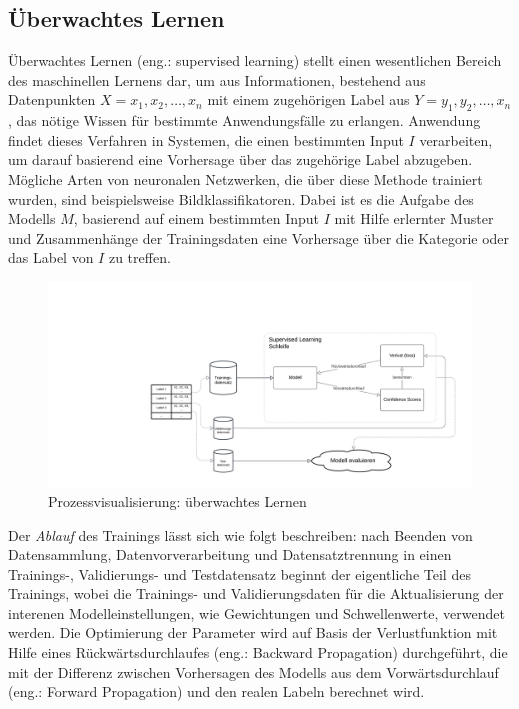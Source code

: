 \subsection{Überwachtes Lernen}\label{subsec:supervisedlearning}
Überwachtes Lernen (eng.: supervised learning) stellt einen wesentlichen Bereich des maschinellen Lernens dar, um aus Informationen, bestehend aus Datenpunkten \textit{$X = x_1, x_2, \ldots, x_n$} mit einem zugehörigen Label aus \textit{$Y = y_1, y_2, \ldots, x_n$}, das nötige Wissen für bestimmte Anwendungsfälle zu erlangen. Anwendung findet dieses Verfahren in Systemen, die einen bestimmten Input $I$ verarbeiten, um darauf basierend eine Vorhersage über das zugehörige Label abzugeben.
Mögliche Arten von neuronalen Netzwerken, die über diese Methode trainiert wurden, sind beispielsweise Bildklassifikatoren. Dabei ist es die Aufgabe des Modells $M$, basierend auf einem bestimmten Input $I$ mit Hilfe erlernter Muster und Zusammenhänge der Trainingsdaten eine Vorhersage über die Kategorie oder das Label von $I$ zu treffen.
\begin{figure}[H]
	\hspace{-30mm}
	\centering
	\includegraphics[width=0.8\linewidth]{Bilder/SupervisedLearning.png}
	\caption{Prozessvisualisierung: überwachtes Lernen}
\end{figure}
Der \textit{Ablauf} des Trainings lässt sich wie folgt beschreiben: nach Beenden von Datensammlung, Datenvorverarbeitung und Datensatztrennung in einen Trainings-, Validierungs- und Testdatensatz beginnt der eigentliche Teil des Trainings, wobei die Trainings- und Validierungsdaten für die Aktualisierung der interenen Modelleinstellungen, wie Gewichtungen und Schwellenwerte, verwendet werden. Die Optimierung der Parameter wird auf Basis der Verlustfunktion mit Hilfe eines Rückwärtsdurchlaufes (eng.: Backward Propagation) durchgeführt, die mit der Differenz zwischen Vorhersagen des Modells aus dem Vorwärtsdurchlauf (eng.: Forward Propagation) und den realen Labeln berechnet wird.


